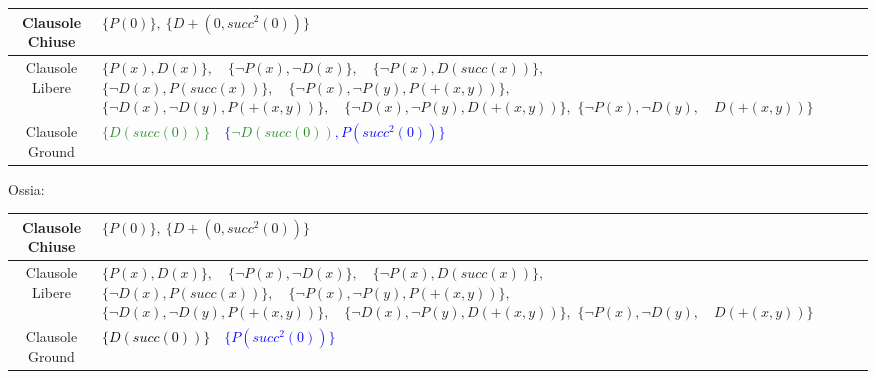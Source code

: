\documentclass[a4paper,10pt]{article}
\begin{document}
\begin{table}[h]
    \centering
    \small 
    \renewcommand{\arraystretch}{1.5} 
    
    \begin{tabularx}{\textwidth}{|c|>{\centering\arraybackslash}X|}
        \hline
        Clausole Chiuse & $\{P(0)\}, \ \{D+(0,succ^2(0))\}$ \\
        \hline
        Clausole Libere & 
            $\{P(x), D(x)\},\quad \{\lnot P(x), \lnot D(x)\},\quad \{\lnot P(x), D(succ(x))\},$\newline
            $\{\lnot D(x), P(succ(x))\},\quad \{\lnot P(x), \lnot P(y), P(+(x, y))\},$\newline
            $\{\lnot D(x), \lnot D(y), P(+(x, y))\},\quad \{\lnot D(x), \lnot P(y), D(+(x, y))\},$\newline
            $\{\lnot P(x), \lnot D(y),\quad D(+(x, y))\}$ 
            \\
        \hline
        Clausole Ground & \textcolor{ForestGreen}{$\{D(succ(0))\}\quad$}\textcolor{blue}{$\{$\textcolor{ForestGreen}{\sout{$\lnot D(succ(0))$}}$,P(succ^2(0))\}$} \\
        \hline
    \end{tabularx}
\end{table}
Ossia:
\begin{table}[h]
    \centering
    \small 
    \renewcommand{\arraystretch}{1.5} 
    
    \begin{tabularx}{\textwidth}{|c|>{\centering\arraybackslash}X|}
        \hline
        Clausole Chiuse & $\{P(0)\}, \ \{D+(0,succ^2(0))\}$ \\
        \hline
        Clausole Libere & 
            $\{P(x), D(x)\},\quad \{\lnot P(x), \lnot D(x)\},\quad \{\lnot P(x), D(succ(x))\},$\newline
            $\{\lnot D(x), P(succ(x))\},\quad \{\lnot P(x), \lnot P(y), P(+(x, y))\},$\newline
            $\{\lnot D(x), \lnot D(y), P(+(x, y))\},\quad \{\lnot D(x), \lnot P(y), D(+(x, y))\},$\newline
            $\{\lnot P(x), \lnot D(y),\quad D(+(x, y))\}$ 
            \\
        \hline
        Clausole Ground & \textcolor{black}{$\{D(succ(0))\}\quad$}\textcolor{blue}{$\{P(succ^2(0))\}\quad$} \\
        \hline
    \end{tabularx}
\end{table}
\end{document}
